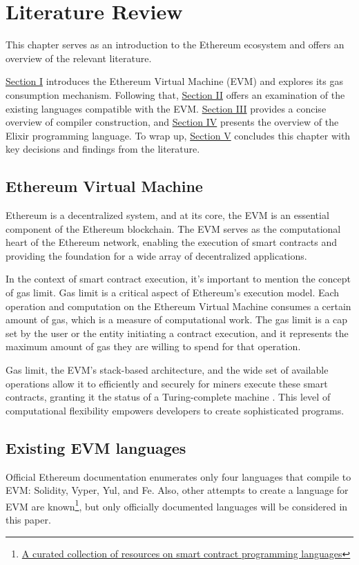 \chapter{Literature Review}
\label{chap:lr}

This chapter serves as an introduction to the Ethereum ecosystem and offers an overview of the relevant literature.

\hyperref[sec:evm]{Section I} introduces the Ethereum Virtual Machine (EVM) and explores its gas consumption mechanism. Following that, \hyperref[sec:langs]{Section II} offers an examination of the existing languages compatible with the EVM. \hyperref[sec:cc]{Section III} provides a concise overview of compiler construction, and \hyperref[sec:ex]{Section IV} presents the overview of the Elixir programming language. To wrap up, \hyperref[sec:conc]{Section V} concludes this chapter with key decisions and findings from the literature.

\section{Ethereum Virtual Machine}
\label{sec:evm}
Ethereum is a decentralized system, and at its core, the EVM is an essential component of the Ethereum blockchain. The EVM serves as the computational heart of the Ethereum network, enabling the execution of smart contracts and providing the foundation for a wide array of decentralized applications.

In the context of smart contract execution, it's important to mention the concept of gas limit. Gas limit is a critical aspect of Ethereum's execution model. Each operation and computation on the Ethereum Virtual Machine consumes a certain amount of gas, which is a measure of computational work. The gas limit is a cap set by the user or the entity initiating a contract execution, and it represents the maximum amount of gas they are willing to spend for that operation.

Gas limit, the EVM's stack-based architecture, and the wide set of available operations allow it to efficiently and securely for miners execute these smart contracts, granting it the status of a Turing-complete machine \cite{EthereumWhitepaper}. This level of computational flexibility empowers developers to create sophisticated programs.

\section{Existing EVM languages}
\label{sec:langs} 
Official Ethereum documentation \cite{OfficialEthereumLanguages} enumerates only four languages that compile to EVM: Solidity, Vyper, Yul, and Fe. Also, other attempts to create a language for EVM are known\footnote{\href{https://github.com/s-tikhomirov/smart-contract-languages}{A curated collection of resources on smart contract programming languages}}, but only officially documented languages will be considered in this paper.

